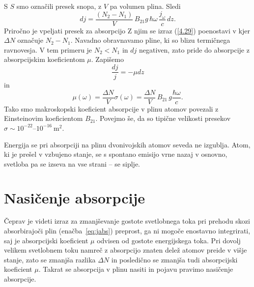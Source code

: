 S $S$ smo označili presek snopa, z $V$ pa volumen plina. Sledi
\begin{equation}
dj=\frac{(N_{2}-N_{1})}{V}\, B_{21}g\, \hbar\omega\,\frac{j_{\omega}}{c}\, dz.
\label{4.29}
\end{equation}
Priročno je vpeljati presek za absorpcijo 
Z njim se izraz (\ref{4.29}) poenostavi v 
kjer $\Delta N$ označuje $N_{2}-N_{1}$.
Navadno obravnavamo pline, ki so blizu termičnega ravnovesja. V tem primeru 
je $N_{2}<N_{1}$ in $dj$ negativen, zato pride do
absorpcije z absorpcijskim koeficientom
$\mu$. Zapišemo 
\begin{equation}
\frac{dj}{j} = -\mu dz
\label{eq:jabs}
\end{equation}
in
\begin{equation}
\mu(\omega)=\frac{\Delta N}{V}\sigma(\omega)=
\frac{\Delta N}{V}\, B_{21}\, g\frac{\hbar\omega}{c}.
\end{equation}
Tako smo makroskopski koeficient absorpcije v plinu atomov povezali
z Einsteinovim koeficientom $B_{21}$. Povejmo še, da so 
tipične velikosti presekov $\sigma \sim 10^{-22}$--$10^{-16}~\si{\metre^2}$. 

\begin{remark}
Energija se pri absorpciji na plinu dvonivojskih atomov seveda
ne izgublja. Atom, ki je prešel v vzbujeno stanje, se s spontano 
emisijo vrne nazaj v osnovno, svetloba pa se izseva na vse strani -- se siplje. 
\end{remark}

\section{Nasičenje absorpcije}
\label{chap:NasAbs}
Čeprav je videti izraz za zmanjševanje 
gostote svetlobnega toka pri prehodu skozi absorbirajoči plin (enačba~\ref{eq:jabs}) 
preprost, ga ni mogoče enostavno integrirati, saj je absorpcijski koeficient 
$\mu$ odvisen od 
gostote energijskega toka. Pri dovolj velikem svetlobnem toku namreč z 
absorpcijo znaten delež atomov preide v višje stanje, zato se zmanjša razlika $\Delta N$
in posledično se zmanjša tudi absorpcijski koeficient $\mu$. Takrat se absorpcija
v plinu nasiti in pojavu pravimo nasičenje absorpcije.

